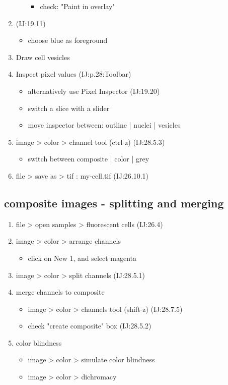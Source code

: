 \documentclass[11pt]{article}
\begin{document}
\begin{enumerate}
\begin{itemize}
\begin{itemize}
\item check: "Paint in overlay"
\end{itemize}
\end{itemize}
\item{} (IJ:19.11)
\begin{itemize}
\item choose blue as foreground
\end{itemize}
\item Draw cell vesicles
\item Inspect pixel values (IJ:p.28:Toolbar)
\begin{itemize}
\item alternatively use Pixel Inspector (IJ:19.20)
\item switch a slice with a slider
\item move inspector between: outline | nuclei | vesicles
\end{itemize}
\item image > color > channel tool (ctrl-z) (IJ:28.5.3)
\begin{itemize}
\item switch between composite | color | grey
\end{itemize}
\item file > save as > tif : my-cell.tif (IJ:26.10.1)
\end{enumerate}

\subsection{composite images - splitting and merging}
\label{sec-2-2}
\begin{enumerate}
\item file > open samples > fluorescent cells (IJ:26.4)
\item image > color > arrange channels 
\begin{itemize}
\item click on New 1, and select magenta
\end{itemize}
\item image > color > split channels (IJ:28.5.1)
\item merge channels to composite
\begin{itemize}
\item image > color > channels tool (shift-z) (IJ:28.7.5)
\item check "create composite" box (IJ:28.5.2)
\end{itemize}
\item color blindness
\begin{itemize}
\item image > color > simulate color blindness
\item image > color > dichromacy
\end{itemize}
\end{enumerate}
\end{document}
